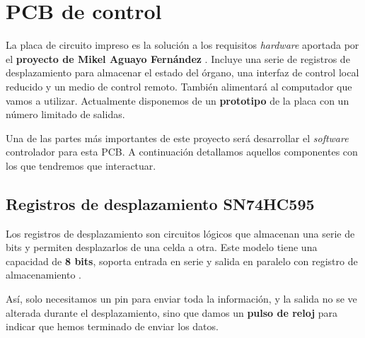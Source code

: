 \smallskip

\section{PCB de control}

La placa de circuito impreso es la solución a los requisitos \textit{hardware} aportada por el \textbf{proyecto de Mikel Aguayo Fernández} \cite{mikel}. Incluye una serie de registros de desplazamiento para almacenar el estado del órgano, una interfaz de control local reducido y un medio de control remoto. También alimentará al computador que vamos a utilizar. Actualmente disponemos de un \textbf{prototipo} de la placa con un número limitado de salidas.

Una de las partes más importantes de este proyecto será desarrollar el \textit{software} controlador para esta \acrshort{PCB}. A continuación detallamos aquellos componentes con los que tendremos que interactuar.

\subsection{Registros de desplazamiento SN74HC595}

Los registros de desplazamiento son circuitos lógicos que almacenan una serie de bits y permiten desplazarlos de una celda a otra. Este modelo tiene una capacidad de \textbf{8 bits}, soporta entrada en serie y salida en paralelo con registro de almacenamiento \cite{shiftreg}. 

Así, solo necesitamos un pin para enviar toda la información, y la salida no se ve alterada durante el desplazamiento, sino que damos un \textbf{pulso de reloj} para indicar que hemos terminado de enviar los datos.

\smallskip

